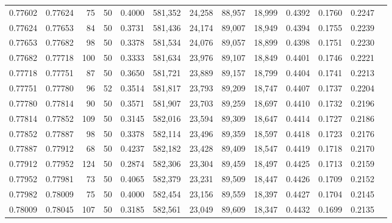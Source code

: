 \begin{tabular}{rrrrrrrrrrrrr}
0.77602 & 0.77624 &    75 &  50 &                                     0.4000 & 581,352 &  24,258 &  88,957 &  18,999 & 0.4392 & 0.1760 & 0.2247 \\
0.77624 & 0.77653 &    84 &  50 &                                     0.3731 & 581,436 &  24,174 &  89,007 &  18,949 & 0.4394 & 0.1755 & 0.2239 \\
0.77653 & 0.77682 &    98 &  50 &                                     0.3378 & 581,534 &  24,076 &  89,057 &  18,899 & 0.4398 & 0.1751 & 0.2230 \\
0.77682 & 0.77718 &   100 &  50 &                                     0.3333 & 581,634 &  23,976 &  89,107 &  18,849 & 0.4401 & 0.1746 & 0.2221 \\
0.77718 & 0.77751 &    87 &  50 &                                     0.3650 & 581,721 &  23,889 &  89,157 &  18,799 & 0.4404 & 0.1741 & 0.2213 \\
0.77751 & 0.77780 &    96 &  52 &                                     0.3514 & 581,817 &  23,793 &  89,209 &  18,747 & 0.4407 & 0.1737 & 0.2204 \\
0.77780 & 0.77814 &    90 &  50 &                                     0.3571 & 581,907 &  23,703 &  89,259 &  18,697 & 0.4410 & 0.1732 & 0.2196 \\
0.77814 & 0.77852 &   109 &  50 &                                     0.3145 & 582,016 &  23,594 &  89,309 &  18,647 & 0.4414 & 0.1727 & 0.2186 \\
0.77852 & 0.77887 &    98 &  50 &                                     0.3378 & 582,114 &  23,496 &  89,359 &  18,597 & 0.4418 & 0.1723 & 0.2176 \\
0.77887 & 0.77912 &    68 &  50 &                                     0.4237 & 582,182 &  23,428 &  89,409 &  18,547 & 0.4419 & 0.1718 & 0.2170 \\
0.77912 & 0.77952 &   124 &  50 &                                     0.2874 & 582,306 &  23,304 &  89,459 &  18,497 & 0.4425 & 0.1713 & 0.2159 \\
0.77952 & 0.77981 &    73 &  50 &                                     0.4065 & 582,379 &  23,231 &  89,509 &  18,447 & 0.4426 & 0.1709 & 0.2152 \\
0.77982 & 0.78009 &    75 &  50 &                                     0.4000 & 582,454 &  23,156 &  89,559 &  18,397 & 0.4427 & 0.1704 & 0.2145 \\
0.78009 & 0.78045 &   107 &  50 &                                     0.3185 & 582,561 &  23,049 &  89,609 &  18,347 & 0.4432 & 0.1699 & 0.2135 \\

\end{tabular}
